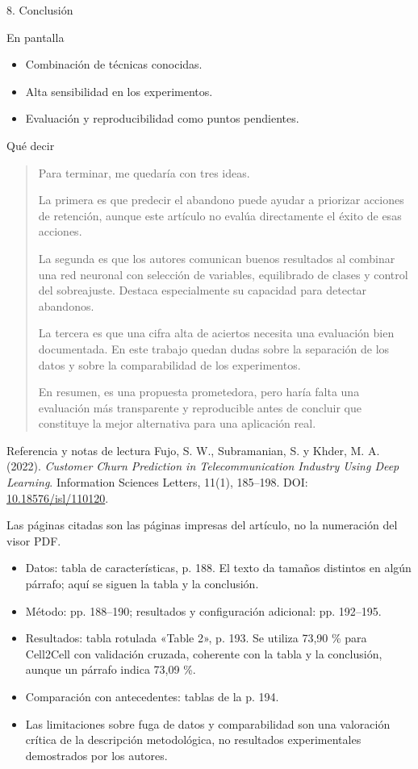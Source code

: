 \documentclass[presentation]{beamer}
\begin{document}
\begin{frame}[label={sec:orgf6fe0f1}]{8. Conclusión}
\begin{block}{En pantalla}
\begin{itemize}
\item Combinación de técnicas conocidas.
\item Alta sensibilidad en los experimentos.
\item Evaluación y reproducibilidad como puntos pendientes.
\end{itemize}
\end{block}
\begin{block}{Qué decir}
\begin{quote}
Para terminar, me quedaría con tres ideas.

La primera es que predecir el abandono puede ayudar a priorizar acciones de retención, aunque este artículo no evalúa directamente el éxito de esas acciones.

La segunda es que los autores comunican buenos resultados al combinar una red neuronal con selección de variables, equilibrado de clases y control del sobreajuste. Destaca especialmente su capacidad para detectar abandonos.

La tercera es que una cifra alta de aciertos necesita una evaluación bien documentada. En este trabajo quedan dudas sobre la separación de los datos y sobre la comparabilidad de los experimentos.

En resumen, es una propuesta prometedora, pero haría falta una evaluación más transparente y reproducible antes de concluir que constituye la mejor alternativa para una aplicación real.
\end{quote}
\end{block}
\end{frame}
\begin{frame}[label={sec:org318534e}]{Referencia y notas de lectura}
Fujo, S. W., Subramanian, S. y Khder, M. A. (2022). \emph{Customer Churn Prediction in Telecommunication Industry Using Deep Learning}. Information Sciences Letters, 11(1), 185–198. DOI: \href{https://doi.org/10.18576/isl/110120}{10.18576/isl/110120}.

Las páginas citadas son las páginas impresas del artículo, no la numeración del visor PDF.

\begin{itemize}
\item Datos: tabla de características, p. 188. El texto da tamaños distintos en algún párrafo; aquí se siguen la tabla y la conclusión.
\item Método: pp. 188–190; resultados y configuración adicional: pp. 192–195.
\item Resultados: tabla rotulada «Table 2», p. 193. Se utiliza 73,90 \% para Cell2Cell con validación cruzada, coherente con la tabla y la conclusión, aunque un párrafo indica 73,09 \%.
\item Comparación con antecedentes: tablas de la p. 194.
\item Las limitaciones sobre fuga de datos y comparabilidad son una valoración crítica de la descripción metodológica, no resultados experimentales demostrados por los autores.
\end{itemize}
\end{frame}
\end{document}
